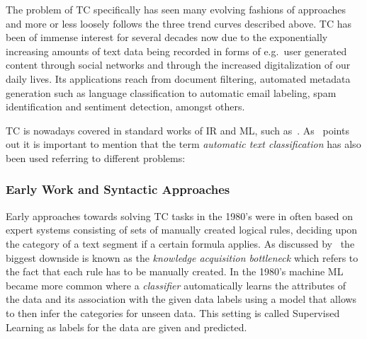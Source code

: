 The problem of \acrfull{TC} specifically has seen many evolving fashions of approaches and more or less loosely follows the three trend curves described above. \gls{TC} has been of immense interest for several decades now due to the exponentially increasing amounts of text data being recorded in forms of e.g.\ user generated content through social networks and through the increased digitalization of our daily lives. Its applications reach from document filtering, automated metadata generation such as language classification to automatic email labeling, spam identification and sentiment detection, amongst others.

\acrlong{TC} is nowadays covered in standard works of \acrlong{IR} and \acrlong{ML}, such as~\cite{Manning:2008aa}. As~\cite{Sebastiani:2002aa} points out it is important to mention that the term \emph{automatic text classification} has also been used referring to different problems: 

\subsubsection*{Early Work and Syntactic Approaches}
\label{subs:Early Work and Syntactic Approaches}

Early approaches towards solving \acrlong{TC} tasks in the 1980's were in often based on expert systems consisting of sets of manually created logical rules, deciding upon the category of a text segment if a certain formula applies. As discussed by~\cite{Sebastiani:2002aa} the biggest downside is known as the \emph{knowledge acquisition bottleneck} which refers to the fact that each rule has to be manually created. In the 1980's machine \acrfull{ML} became more common where a \emph{classifier} automatically learns the attributes of the data and its association with the given data labels using a model that allows to then infer the categories for unseen data. This setting is called \gls{Supervised Learning} as labels for the data are given and predicted.

